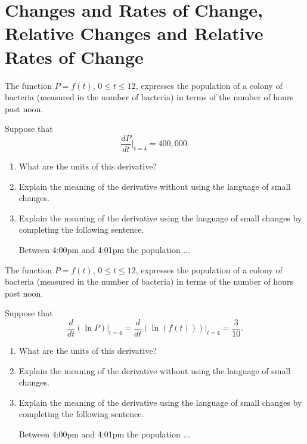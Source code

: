 \documentclass{ximera}
\begin{document}
\section{Changes and Rates of Change, Relative Changes and Relative Rates of Change}

\begin{question}  \label{Qdfdgndfdfdfnhn}
The function $P=f(t)$, $0\leq t \leq 12$, expresses the population of a colony of bacteria (measured in the number of bacteria) in terms of the number of hours past noon.

Suppose that
\[
     \frac{dP}{dt}\Big|_{t=4} = 400,000.
\]

\begin{enumerate}
\item What are the units of this derivative?

\item Explain the meaning of the derivative without using the language of small changes.

\item Explain the meaning of the derivative using the language of small changes by completing the following sentence.

Between 4:00pm and 4:01pm the population ...
\end{enumerate}

\end{question}


\begin{question}  \label{Qghldfdfgng}
The function $P=f(t)$, $0\leq t \leq 12$, expresses the population of a colony of bacteria (measured in the number of bacteria) in terms of the number of hours past noon.

Suppose that
\[
   \frac{d}{dt} \left(  \ln P \right)\Big|_{t=4} = \frac{d}{dt} \left(  \ln (f(t)) \right)\Big|_{t=4}  = \frac{3}{10} .
\]

\begin{enumerate}
\item What are the units of this derivative?

\item Explain the meaning of the derivative without using the language of small changes.

\item Explain the meaning of the derivative using the language of small changes by completing the following sentence.

Between 4:00pm and 4:01pm the population ...
\end{enumerate}
\end{question}
\end{document}
